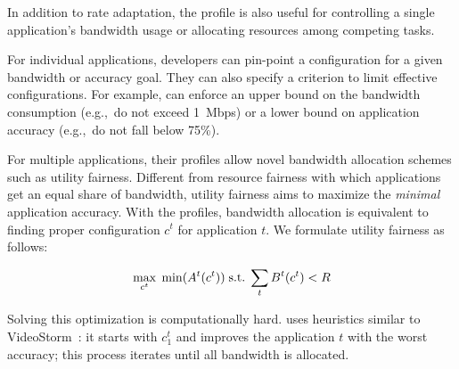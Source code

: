 In addition to rate adaptation, the profile is also useful for controlling a
single application's bandwidth usage or allocating resources among competing
tasks.

For individual applications, developers can pin-point a configuration for a
given bandwidth or accuracy goal. They can also specify a criterion to limit
effective configurations. For example, \sysname{} can enforce an upper bound on
the bandwidth consumption (e.g.,~do not exceed \SI{1}{Mbps}) or a lower bound on
application accuracy (e.g.,~do not fall below 75\%).

For multiple applications, their profiles allow novel bandwidth allocation
schemes such as utility fairness. Different from resource fairness with which
applications get an equal share of bandwidth, utility fairness aims to maximize
the \textit{minimal} application accuracy. With the profiles, bandwidth
allocation is equivalent to finding proper configuration $c^t$ for application
$t$. We formulate utility fairness as follows:


\vspace{-0.5em}
\begin{equation}
  \vspace{-0.5em}
  \label{eq:multitask}
 \underset{c^t}{\max} \; \min({A^t(c^t)})
 \;
 \text{s.t.}
 \;
 \sum_t{B^t(c^t)} < R
\end{equation}


Solving this optimization is computationally hard. \sysname{} uses heuristics
similar to VideoStorm~\cite{zhang2017live}: it starts with $c^t_1$ and improves
the application $t$ with the worst accuracy; this process iterates until all
bandwidth is allocated. 


